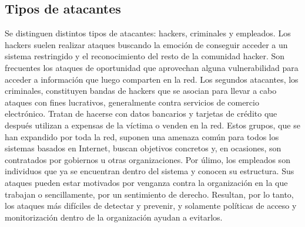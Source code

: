 \subsection{Tipos de atacantes}
Se distinguen distintos tipos de atacantes: hackers, criminales y empleados. Los hackers suelen realizar ataques buscando la emoción de conseguir acceder a un sistema restringido y el reconocimiento del resto de la comunidad hacker. Son frecuentes los ataques de oportunidad que aprovechan alguna vulnerabilidad para acceder a información que luego comparten en la red. Los segundos atacantes, los criminales, constituyen bandas de hackers que se asocian para llevar a cabo ataques con fines lucrativos, generalmente contra servicios de comercio electrónico. Tratan de hacerse con datos bancarios y tarjetas de crédito que después utilizan a expensas de la víctima o venden en la red.
Estos grupos, que se han expandido por toda la red, suponen una amenaza común para todos los sistemas basados en Internet, buscan objetivos concretos y, en ocasiones, son contratados por gobiernos u otras organizaciones. Por úlimo, los empleados son individuos que ya se encuentran dentro del sistema y conocen su estructura. Sus ataques pueden estar motivados por venganza contra la organización en la que trabajan o sencillamente, por un sentimiento de derecho. Resultan, por lo tanto, los ataques más difíciles de detectar y prevenir, y solamente políticas de acceso y monitorización dentro de la organización ayudan a evitarlos\cite{Stallings2016}.

